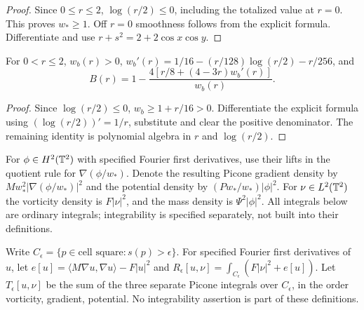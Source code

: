 \begin{proof}
\leanok
Since $0\le r\le2$, $\log(r/2)\le0$, including the totalized value
at $r=0$. This proves $w_*\ge1$. Off $r=0$ smoothness follows from
the explicit formula. Differentiate and use $r+s^2=2+2\cos x\cos y$.
\end{proof}

\begin{lemma}
\label{lem:dd-boundary-ground-algebra}
\leanok
For $0<r\le2$, $w_b(r)>0$,
$w_b'(r)=1/16-(r/128)\log(r/2)-r/256$, and
\[
 B(r)=1-\frac{4[r/8+(4-3r)w_b'(r)]}{w_b(r)}.
\]
\end{lemma}

\begin{proof}
\leanok
Since $\log(r/2)\le0$, $w_b\ge1+r/16>0$. Differentiate the explicit
formula using $(\log(r/2))'=1/r$, substitute and clear the positive
denominator. The remaining identity is polynomial algebra in $r$ and
$\log(r/2)$.
\end{proof}

\begin{definition}
\label{def:dd-exclusion-forms}
\leanok
For $\phi\in H^2(\mathbb{T}^2)$ with specified Fourier first derivatives, use their
lifts in the quotient rule for $\nabla(\phi/w_*)$. Denote the resulting
Picone gradient density by $Mw_*^2|\nabla(\phi/w_*)|^2$ and the potential
density by $(Pw_*/w_*)|\phi|^2$. For $\nu\in L^2(\mathbb{T}^2)$ the vorticity
density is $F|\nu|^2$, and the mass density is $\Psi^2|\phi|^2$.
All integrals below are ordinary integrals; integrability is specified
separately, not built into their definitions.
\end{definition}

\begin{definition}
\label{def:dd-picone-truncations}
\leanok
Write $C_\epsilon=\{p\in\text{cell square}:s(p)>\epsilon\}$.
For specified Fourier first derivatives of $u$, let
$e[u]=\langle M\nabla u,\nabla u\rangle-F|u|^2$ and
$R_\epsilon[u,\nu]=\int_{C_\epsilon}(F|\nu|^2+e[u])$.
Let $T_\epsilon[u,\nu]$ be the sum of the three separate Picone integrals
over $C_\epsilon$, in the order vorticity, gradient, potential.
No integrability assertion is part of these definitions.
\end{definition}

